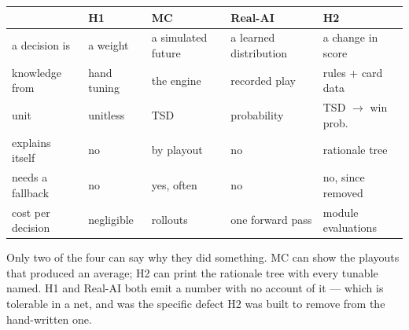 \documentclass[11pt,a4paper]{article}
\begin{document}
\begin{center}\small
\begin{tabular}{lllll}
\toprule
 & \textbf{H1} & \textbf{MC} & \textbf{Real-AI} & \textbf{H2} \\
\midrule
a decision is & a weight & a simulated future & a learned distribution & a change in score \\
knowledge from & hand tuning & the engine & recorded play & rules + card data \\
unit & unitless & TSD & probability & TSD $\rightarrow$ win prob. \\
explains itself & no & by playout & no & rationale tree \\
needs a fallback & no & yes, often & no & no, since removed \\
cost per decision & negligible & rollouts & one forward pass & module evaluations \\
\bottomrule
\end{tabular}
\end{center}

Only two of the four can say why they did something. MC can show the playouts
that produced an average; H2 can print the rationale tree with every tunable
named. H1 and Real-AI both emit a number with no account of it --- which is
tolerable in a net, and was the specific defect H2 was built to remove from the
hand-written one.
\end{document}
